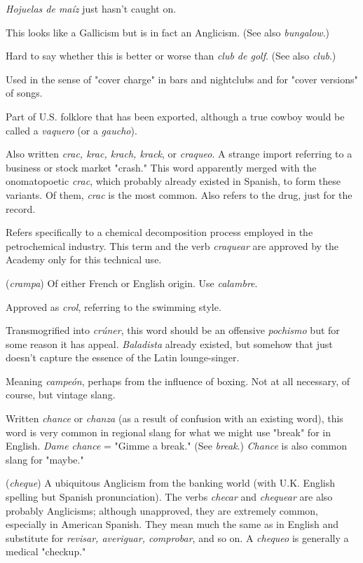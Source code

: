  \emph{Hojuelas de maíz} just hasn't caught on.

 This looks like a Gallicism but is in fact an Anglicism. (See also \emph{bungalow}.)

 Hard to say whether this is better or worse
than \emph{club de golf}. (See also \emph{club}.)

 Used in the sense of "cover charge" in bars and nightclubs and for "cover versions" of songs.

 Part of U.S. folklore that has been exported, although a true cowboy would be called a \emph{vaquero} (or a \emph{gaucho}).

 Also written \emph{crac, krac, krach, krack}, or \emph{craqueo}. A
strange import referring to a business or stock market "crash." This
word apparently merged with the onomatopoetic \emph{crac}, which probably
already existed in Spanish, to form these variants. Of them, \emph{crac} is the
most common. Also refers to the drug, just for the record.

 Refers specifically to a chemical decomposition
process employed in the petrochemical industry. This term and the
verb \emph{craquear} are approved by the Academy only for this technical use.

 (\emph{crampa}) Of either French or English origin. Use
\emph{calambre}.

 Approved as \emph{crol}, referring to the swimming style.

 Transmogrified into \emph{crúner}, this word should be
an offensive \emph{pochismo} but for some reason it has appeal. \emph{Baladista} already existed, but somehow that just doesn't capture the essence of the
Latin lounge-singer.

 Meaning \emph{campeón}, perhaps from the influence of
boxing. Not at all necessary, of course, but vintage slang.

 Written \emph{chance} or \emph{chanza} (as a result of confusion
with an existing word), this word is very common in regional slang for
what we might use "break" for in English. \emph{Dame chance} = "Gimme a
break." (See \emph{break}.) \emph{Chance} is also common slang for "maybe."

 (\emph{cheque}) A ubiquitous Anglicism from the banking world (with U.K. English spelling but Spanish pronunciation). The
verbs \emph{checar} and \emph{chequear} are also probably Anglicisms; although unapproved, they are extremely common, especially in American Spanish. They mean much the same as in English and substitute for \emph{revisar,
averiguar, comprobar}, and so on. A \emph{chequeo} is generally a medical
"checkup."

